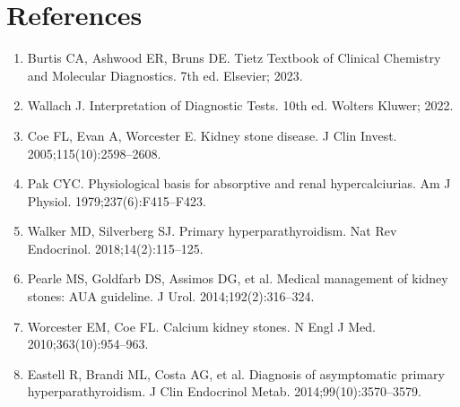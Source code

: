 \section*{References}
\begin{enumerate}
  \item Burtis CA, Ashwood ER, Bruns DE. Tietz Textbook of Clinical Chemistry and Molecular Diagnostics. 7th ed. Elsevier; 2023.
  \item Wallach J. Interpretation of Diagnostic Tests. 10th ed. Wolters Kluwer; 2022.
  \item Coe FL, Evan A, Worcester E. Kidney stone disease. J Clin Invest. 2005;115(10):2598--2608.
  \item Pak CYC. Physiological basis for absorptive and renal hypercalciurias. Am J Physiol. 1979;237(6):F415--F423.
  \item Walker MD, Silverberg SJ. Primary hyperparathyroidism. Nat Rev Endocrinol. 2018;14(2):115--125.
  \item Pearle MS, Goldfarb DS, Assimos DG, et al. Medical management of kidney stones: AUA guideline. J Urol. 2014;192(2):316--324.
  \item Worcester EM, Coe FL. Calcium kidney stones. N Engl J Med. 2010;363(10):954--963.
  \item Eastell R, Brandi ML, Costa AG, et al. Diagnosis of asymptomatic primary hyperparathyroidism. J Clin Endocrinol Metab. 2014;99(10):3570--3579.
\end{enumerate}

\clearpage
